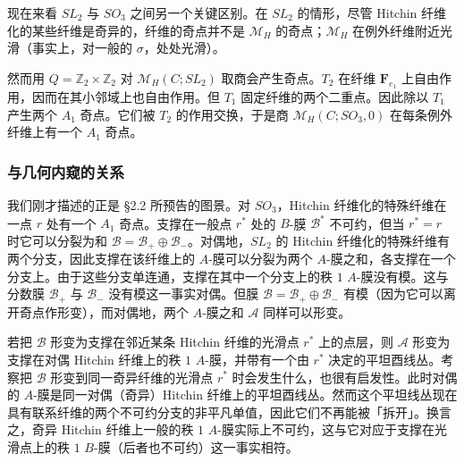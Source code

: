 \documentclass[11pt,a4paper]{article}
\begin{document}
现在来看 $SL_2$ 与 $SO_3$ 之间另一个关键区别。在 $SL_2$ 的情形，尽管 Hitchin 纤维化的某些纤维是奇异的，纤维的奇点并不是 $\mathcal{M}_H$ 的奇点；$\mathcal{M}_H$ 在例外纤维附近光滑（事实上，对一般的 $\sigma$，处处光滑）。


然而用 $Q=\mathbb{Z}_2\times\mathbb{Z}_2$ 对 $\mathcal{M}_H(C;SL_2)$ 取商会产生奇点。$T_2$ 在纤维 $\boldsymbol{F}_{e_1}$ 上自由作用，因而在其小邻域上也自由作用。但 $T_1$ 固定纤维的两个二重点。因此除以 $T_1$ 产生两个 $A_1$ 奇点。它们被 $T_2$ 的作用交换，于是商 $\mathcal{M}_H(C;SO_3,0)$ 在每条例外纤维上有一个 $A_1$ 奇点。

\subsubsection{与几何内窥的关系}

我们刚才描述的正是 §2.2 所预告的图景。对 $SO_3$，Hitchin 纤维化的特殊纤维在一点 $r$ 处有一个 $A_1$ 奇点。支撑在一般点 $r^*$ 处的 $B$-膜 $\mathcal{B}^*$ 不可约，但当 $r^*=r$ 时它可以分裂为和 $\mathcal{B}=\mathcal{B}_+\oplus\mathcal{B}_-$。对偶地，$SL_2$ 的 Hitchin 纤维化的特殊纤维有两个分支，因此支撑在该纤维上的 $A$-膜可以分裂为两个 $A$-膜之和，各支撑在一个分支上。由于这些分支单连通，支撑在其中一个分支上的秩 $1$ $A$-膜没有模。这与分数膜 $\mathcal{B}_+$ 与 $\mathcal{B}_-$ 没有模这一事实对偶。但膜 $\mathcal{B}=\mathcal{B}_+\oplus\mathcal{B}_-$ 有模（因为它可以离开奇点作形变），而对偶地，两个 $A$-膜之和 $\mathcal{A}$ 同样可以形变。

若把 $\mathcal{B}$ 形变为支撑在邻近某条 Hitchin 纤维的光滑点 $r^*$ 上的点层，则 $\mathcal{A}$ 形变为支撑在对偶 Hitchin 纤维上的秩 $1$ $A$-膜，并带有一个由 $r^*$ 决定的平坦酉线丛。考察把 $\mathcal{B}$ 形变到同一奇异纤维的光滑点 $r^*$ 时会发生什么，也很有启发性。此时对偶的 $A$-膜是同一对偶（奇异）Hitchin 纤维上的平坦酉线丛。然而这个平坦线丛现在具有联系纤维的两个不可约分支的非平凡单值，因此它们不再能被「拆开」。换言之，奇异 Hitchin 纤维上一般的秩 $1$ $A$-膜实际上不可约，这与它对应于支撑在光滑点上的秩 $1$ $B$-膜（后者也不可约）这一事实相符。
\end{document}
